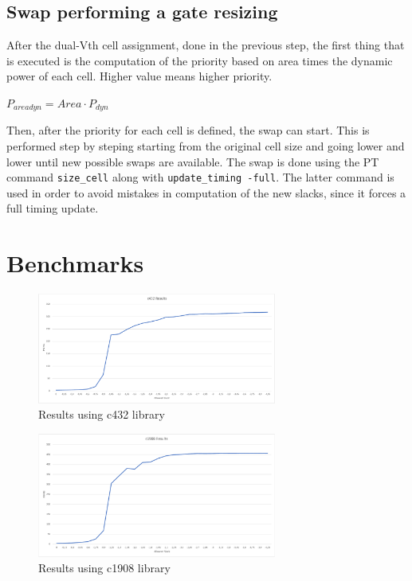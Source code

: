 \documentclass{article}
\begin{document}
		\subsection{Swap performing a gate resizing}
		After the dual-Vth cell assignment, done in the previous step, the first thing that is executed is the computation of the priority based on area times the dynamic power of each cell. Higher value means higher priority.
		
		\begin{center}
			$P_{areadyn} = Area \cdot P_{dyn}$
		\end{center}
		
		
		Then, after the priority for each cell is defined, the swap can start. This is performed step by steping starting from the original cell size and going lower and lower until new possible swaps are available. The swap is done using the PT command \texttt{size\_cell} along with \texttt{update\_timing -full}. The latter command is used in order to avoid mistakes in computation of the new slacks, since it forces a full timing update. 
		
		\newpage
				\thispagestyle{empty}
		\section{Benchmarks}
		\begin{figure}[ht]
			\centering
			\includegraphics[width=0.7\textwidth]{Immagini/c432}
		\caption{Results using c432 library}
		\label{benchmark1}
	\end{figure}

	\begin{figure}[ht]
		\centering
		\includegraphics[width=0.7\textwidth]{Immagini/c1908}
		\caption{Results using c1908 library}
		\label{benchmark2}
	\end{figure}
\end{document}
